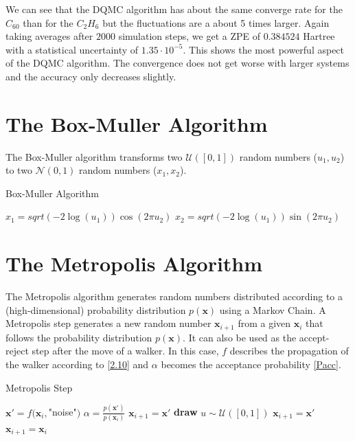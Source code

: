 \documentclass [12pt]{report}
\begin{document}
We can see that the DQMC algorithm has about the same converge rate for the $C_{60}$ than for the $C_2H_6$ but the fluctuations are a about 5 times larger. Again taking averages after $2000$ simulation steps, we get a ZPE of $0.384524$ Hartree with a statistical uncertainty of $1.35 \cdot 10^{-5}$. This shows the most powerful aspect of the DQMC algorithm. The convergence does not get worse with larger systems and the accuracy only decreases slightly. 

\begin{appendices}
\chapter{The Box-Muller Algorithm} \label{appendixA}
The Box-Muller algorithm transforms two $\mathcal{U}([0,1])$ random numbers ($u_1, u_2$) to two $\mathcal{N}(0,1)$ random numbers ($x_1, x_2$).

\begin{algorithm}
\caption{Box-Muller Algorithm}\label{box-muller}
\begin{algorithmic}[1]
\State $x_1 = sqrt(-2\log(u_1))\cos(2\pi u_2)$
\State $x_2 = sqrt(-2\log(u_1))\sin(2\pi u_2)$
\EndProcedure
\end{algorithmic}
\end{algorithm}

\chapter{The Metropolis Algorithm} \label{appendixB}
The Metropolis algorithm generates random numbers distributed according to a (high-dimensional) probability distribution $p(\bm{x})$ using a Markov Chain. A Metropolis step generates a new random number $\bm{x}_{i+1}$ from a given $\bm{x}_i$ that follows the probability distribution $p(\bm{x})$. It can also be used as the accept-reject step after the move of a walker. In this case, $f$ describes the propagation of the walker according to \eqref{2.10} and $\alpha$ becomes the acceptance probability \eqref{Pacc}.

\begin{algorithm}
\caption{Metropolis Step}\label{metropolis}
\begin{algorithmic}[1]
\State $\bm{x}' = f(\bm{x}_i,$"noise"$)$ 
\State $\alpha = \frac{p(\bm{x}')}{p(\bm{x}_i)}$
	\State $\bm{x}_{i+1} = \bm{x}'$ 
\Else
	\State \textbf{draw} $u \sim \mathcal{U}([0,1])$
		\State $\bm{x}_{i+1} = \bm{x}'$ 
	\Else
		\State $\bm{x}_{i+1} = \bm{x}_i$ 
	\EndIf
\EndIf 
\EndProcedure
\end{algorithmic}
\end{algorithm}


\end{appendices}
\end{document}
